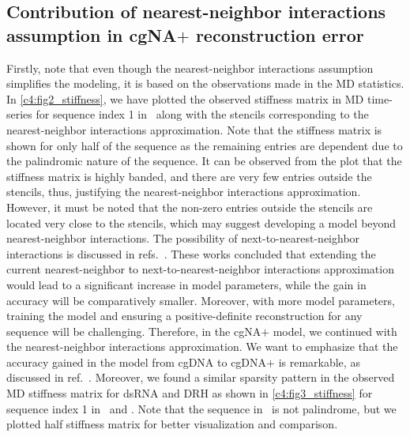 \subsection{Contribution of nearest-neighbor interactions assumption in cgNA$+$ reconstruction error}\label{c4:s3sb1}
Firstly, note that even though the nearest-neighbor interactions assumption simplifies the modeling, it is based on the observations made in the MD statistics.
In \cref{c4:fig2_stiffness}, we have plotted the observed stiffness matrix in MD time-series for sequence index 1 in \Lbdna \ along with the stencils corresponding to the nearest-neighbor interactions approximation. 
Note that the stiffness matrix is shown for only half of the sequence as the remaining entries are dependent due to the palindromic nature of the sequence. 
It can be observed from the plot that the stiffness matrix is highly banded, and there are very few entries outside the stencils, thus, justifying the nearest-neighbor interactions approximation.
However, it must be noted that the non-zero entries outside the stencils are located very close to the stencils, which may suggest developing a model beyond nearest-neighbor interactions.
The possibility of next-to-nearest-neighbor interactions is discussed in refs.~\cite{patelithesis,cgDNA1,petkevivciute2014cgdna}.
These works concluded that extending the current nearest-neighbor to next-to-nearest-neighbor interactions approximation would lead to a significant increase in model parameters, while the gain in accuracy will be comparatively smaller.
Moreover, with more model parameters, training the model and ensuring a positive-definite reconstruction for any sequence will be challenging.
Therefore, in the cgNA$+$ model, we continued with the nearest-neighbor interactions approximation.
We want to emphasize that the accuracy gained in the model from cgDNA to cgDNA$+$ is remarkable, as discussed in ref.~\cite{patelithesis}.
Moreover, we found a similar sparsity pattern in the observed MD stiffness matrix for dsRNA and DRH as shown in \cref{c4:fig3_stiffness} for sequence index 1 in \Lbrna \ and \Lbdrh. 
Note that the sequence in \Lbdrh \ is not palindrome, but we plotted half stiffness matrix for better visualization and comparison.

